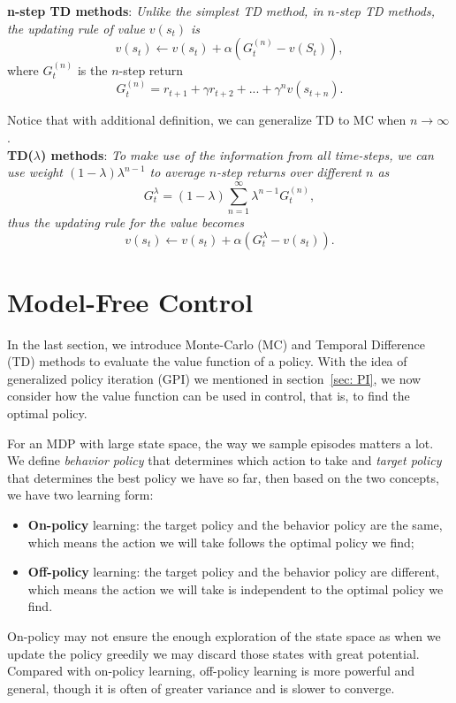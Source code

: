 \documentclass{progartcn}
\begin{document}
		\textbf{n-step TD methods}: \textit{Unlike the simplest TD method, in $n$-step TD methods, the updating rule of value $v(s_t)$ is}
		\[v(s_t)\gets v(s_t)+\alpha(G_t^{(n)}-v(S_t)),\]
		where $G_t^{(n)}$ is the $n$-step return
		\[G_t^{(n)}=r_{t+1}+\gamma r_{t+2}+...+\gamma ^nv(s_{t+n}).\]

		Notice that with additional definition, we can generalize TD to MC when $n\to\infty$.\\

		\textbf{TD($\lambda$) methods}: \textit{To make use of the information from all time-steps, we can use weight $(1-\lambda)\lambda^{n-1}$ to average $n$-step returns over different $n$ as}
		\[G_t^\lambda=(1-\lambda)\sum_{n=1}^\infty \lambda^{n-1}G_t^{(n)},\]
		\textit{thus the updating rule for the value becomes}
		\[v(s_t)\gets v(s_t)+\alpha(G_t^\lambda - v(s_t)).\]

\pagebreak

\section{Model-Free Control}

	In the last section, we introduce Monte-Carlo (MC) and Temporal Difference (TD) methods to evaluate the value function of a policy. With the idea of generalized policy iteration (GPI) we mentioned in section~\ref{sec: PI}, we now consider how the value function can be used in control, that is, to find the optimal policy.

	For an MDP with large state space, the way we sample episodes matters a lot. We define \textit{behavior policy} that determines which action to take and \textit{target policy} that determines the best policy we have so far, then based on the two concepts, we have two learning form:
	\begin{itemize}[noitemsep,topsep=0pt]
		\item \textbf{On-policy} learning: the target policy and the behavior policy are the same, which means the action we will take follows the optimal policy we find;
		\item \textbf{Off-policy} learning: the target policy and the behavior policy are different, which means the action we will take is independent to the optimal policy we find.
	\end{itemize}

	On-policy may not ensure the enough exploration of the state space as when we update the policy greedily we may discard those states with great potential. Compared with on-policy learning, off-policy learning is more powerful and general, though it is often of greater variance and is slower to converge.\\
\end{document}
